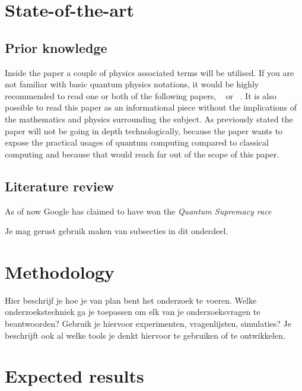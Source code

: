 
\section{State-of-the-art}
\label{sec:state-of-the-art}
\subsection{Prior knowledge}
Inside the paper a couple of physics associated terms will be utilised. If you are not familiar with basic quantum physics notations, it would be highly recommended to read one or both of the following papers, ~\textcite{Rieffel1998} or ~\textcite{Shor2000}. It is also possible to read this paper as an informational piece without the implications of the mathematics and physics surrounding the subject. As previously stated the paper will not be going in depth technologically, because the paper wants to expose the practical usages of quantum computing compared to classical computing and because that would reach far out of the scope of this paper.

\subsection{Literature review}

As of now Google has claimed to have won the \emph{Quantum Supremacy race} ~\autocite{Google2019}

Je mag gerust gebruik maken van subsecties in dit onderdeel.

\section{Methodology}
\label{sec:methodologie}

Hier beschrijf je hoe je van plan bent het onderzoek te voeren. Welke onderzoekstechniek ga je toepassen om elk van je onderzoeksvragen te beantwoorden? Gebruik je hiervoor experimenten, vragenlijsten, simulaties? Je beschrijft ook al welke tools je denkt hiervoor te gebruiken of te ontwikkelen.

\section{Expected results}
\label{sec:verwachte_resultaten}

